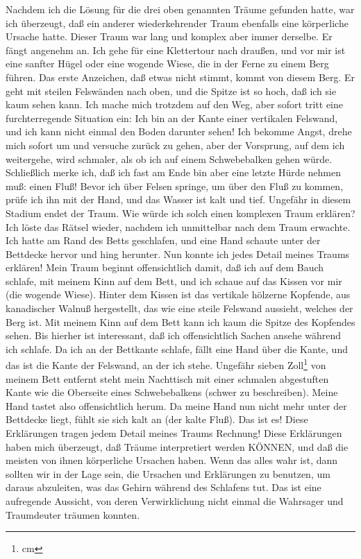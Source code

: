 Nachdem ich die Lösung für die drei oben genannten Träume gefunden hatte, war ich überzeugt, daß ein anderer wiederkehrender Traum ebenfalls eine körperliche Ursache hatte.
Dieser Traum war lang und komplex aber immer derselbe.
Er fängt angenehm an.
Ich gehe für eine Klettertour nach draußen, und vor mir ist eine sanfter Hügel oder eine wogende Wiese, die in der Ferne zu einem Berg führen.
Das erste Anzeichen, daß etwas nicht stimmt, kommt von diesem Berg.
Er geht mit steilen Felswänden nach oben, und die Spitze ist so hoch, daß ich sie kaum sehen kann.
Ich mache mich trotzdem auf den Weg, aber sofort tritt eine furchterregende Situation ein: Ich bin an der Kante einer vertikalen Felswand, und ich kann nicht einmal den Boden darunter sehen!
Ich bekomme Angst, drehe mich sofort um und versuche zurück zu gehen, aber der Vorsprung, auf dem ich weitergehe, wird schmaler, als ob ich auf einem Schwebebalken gehen würde.
Schließlich merke ich, daß ich fast am Ende bin aber eine letzte Hürde nehmen muß: einen Fluß!
Bevor ich über Felsen springe, um über den Fluß zu kommen, prüfe ich ihn mit der Hand, und das Wasser ist kalt und tief.
Ungefähr in diesem Stadium endet der Traum.
Wie würde ich solch einen komplexen Traum erklären?
Ich löste das Rätsel wieder, nachdem ich unmittelbar nach dem Traum erwachte.
Ich hatte am Rand des Betts geschlafen, und eine Hand schaute unter der Bettdecke hervor und hing herunter.
Nun konnte ich jedes Detail meines Traums erklären!
Mein Traum beginnt offensichtlich damit, daß ich auf dem Bauch schlafe, mit meinem Kinn auf dem Bett, und ich schaue auf das Kissen vor mir (die wogende Wiese).
Hinter dem Kissen ist das vertikale hölzerne Kopfende, aus kanadischer Walnuß hergestellt, das wie eine steile Felswand aussieht, welches der Berg ist.
Mit meinem Kinn auf dem Bett kann ich kaum die Spitze des Kopfendes sehen.
Bis hierher ist interessant, daß ich offensichtlich Sachen ansehe während ich schlafe.
Da ich an der Bettkante schlafe, fällt eine Hand über die Kante, und das ist die Kante der Felswand, an der ich stehe.
Ungefähr sieben Zoll\footnote{ cm} von meinem Bett entfernt steht mein Nachttisch mit einer schmalen abgestuften Kante wie die Oberseite eines Schwebebalkens (schwer zu beschreiben).
Meine Hand tastet also offensichtlich herum.
Da meine Hand nun nicht mehr unter der Bettdecke liegt, fühlt sie sich kalt an (der kalte Fluß). Das ist es!
Diese Erklärungen tragen jedem Detail meines Traums Rechnung!
Diese Erklärungen haben mich überzeugt, daß Träume interpretiert werden KÖNNEN, und daß die meisten von ihnen körperliche Ursachen haben.
Wenn das alles wahr ist, dann sollten wir in der Lage sein, die Ursachen und Erklärungen zu benutzen, um daraus abzuleiten, was das Gehirn während des Schlafens tut.
Das ist eine aufregende Aussicht, von deren Verwirklichung nicht einmal die Wahrsager und Traumdeuter träumen konnten.


